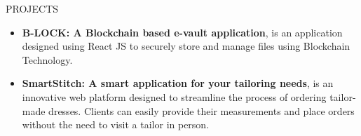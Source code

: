 \documentclass{resume} %
\begin{document}
\begin{rSection}{PROJECTS}
\begin{itemize}

    \item \textbf{B-LOCK: A Blockchain based e-vault application}{, is 
    an application designed using React JS to securely store and manage 
    files using Blockchain Technology. 
    }


\item \textbf{SmartStitch: A smart application for your tailoring needs}{, is an innovative web platform designed to streamline the process of ordering tailor-made dresses. 
Clients can easily provide their measurements and place orders without the need to visit a tailor in person.
}


\end{itemize}  

\end{rSection}
\end{document}
